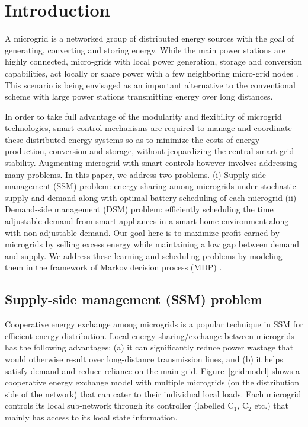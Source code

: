 \section{Introduction}

A microgrid is a networked group of distributed energy sources with the goal of
generating, converting and storing energy. 
While the main power stations are highly connected, micro-grids with local power generation, storage
and conversion capabilities, act locally or share power with a few neighboring micro-grid nodes \cite{farhangi2010path}.
This scenario is being envisaged as an important alternative to the conventional scheme with
large power stations transmitting energy over long distances.

In order to take full advantage of the modularity and flexibility of microgrid technologies, smart control mechanisms are required to manage and coordinate these distributed energy systems so as to minimize the costs of energy production, conversion and storage, without jeopardizing the central smart grid stability.
 Augmenting microgrid with smart controls however involves addressing many problems. In this paper, we address two  problems. (i) Supply-side management (SSM) problem: energy sharing among  microgrids under stochastic supply and demand along with  optimal battery scheduling of each microgrid (ii) Demand-side management (DSM) problem: efficiently scheduling the time adjustable demand from smart appliances in a smart home environment along with non-adjustable demand. Our goal here is to maximize profit earned by
microgrids by selling excess energy while maintaining a low
gap between demand and supply. 
 We address these learning and scheduling problems by modeling them in the framework of Markov decision process (MDP) \cite{puterman2014markov}. 

\subsection{Supply-side management (SSM) problem}
 Cooperative energy exchange among microgrids is a popular technique in SSM for efficient energy distribution.  Local energy sharing/exchange between microgrids has the
following advantages:
(a) it can significantly reduce power wastage that would
otherwise result over long-distance transmission lines, and (b) it
helps satisfy demand and reduce reliance on the main grid. Figure~\ref{gridmodel} shows a cooperative energy exchange model with multiple microgrids
(on the distribution side of the network) that can cater to their individual
local loads. Each microgrid controls its local sub-network through its controller (labelled
$\mbox{C}_1$, $\mbox{C}_2$ etc.) that mainly has access to its local state information.


